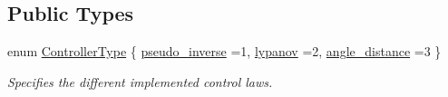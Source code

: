 \subsection*{Public Types}
\begin{DoxyCompactItemize}
\item 
enum \hyperlink{classController_aa6d956c4c220461a4152415ffa78690a}{Controller\+Type} \{ \hyperlink{classController_aa6d956c4c220461a4152415ffa78690aad2e9073ef821965020410686a3c89483}{pseudo\+\_\+inverse} =1, 
\hyperlink{classController_aa6d956c4c220461a4152415ffa78690aaed0e850e561d54619d85f32c37f5bfab}{lypanov} =2, 
\hyperlink{classController_aa6d956c4c220461a4152415ffa78690aa7ab0ee34114a951d4491d6eb73500cdc}{angle\+\_\+distance} =3
 \}\begin{DoxyCompactList}\small\item\em Specifies the different implemented control laws. \end{DoxyCompactList}
\end{DoxyCompactItemize}

